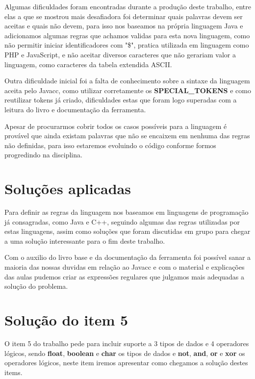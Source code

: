 \documentclass[
	article,			%
	11pt,				%
	oneside,			%
	a4paper,			%
	portuguese,			%
	brazil,				%
	sumario=tradicional
	]{abntex2}
\begin{document}
Algumas dificuldades foram encontradas durante a produção deste trabalho, entre elas a que se mostrou mais desafiadora foi determinar quais palavras devem ser aceitas e 
quais não devem, para isso nos baseamos na própria linguagem Java e adicionamos algumas regras que achamos validas para esta nova linguagem, como não permitir iniciar
identificadores com "\$", pratica utilizada em linguagem como PHP e JavaScript, e não aceitar diversos caracteres que não gerariam valor a linguagem, como caracteres da  tabela
extendida ASCII.

Outra dificuldade inicial foi a falta de conhecimento sobre a sintaxe da linguagem aceita pelo Javacc, como utilizar corretamente os \textbf{SPECIAL\_TOKENS} e como reutilizar tokens
já criado, dificuldades estas que foram logo superadas com a leitura do livro e documentação da ferramenta.

Apesar de procurarmos cobrir todos os casos possíveis para a linguagem é provável que ainda existam palavras que não se encaixem em nenhuma das regras não definidas,
para isso estaremos evoluindo o código conforme formos progredindo na disciplina.

\section{Soluções aplicadas}

Para definir as regras da linguagem nos baseamos em linguagens de programação já consagradas, como Java e C++, seguindo algumas das regras utilizadas por estas
linguagens, assim como soluções que foram discutidas em grupo para chegar a uma solução interessante para o fim deste trabalho.

Com o auxilio do livro base e da documentação da ferramenta foi possível  sanar a maioria das nossas duvidas em relação ao Javacc e com o material e explicações das aulas
pudemos criar as expressões regulares que julgamos mais adequadas a solução do problema.

\section{Solução do item 5}

O item 5 do trabalho pede para incluir suporte a 3 tipos de dados e 4 operadores lógicos, sendo \textbf{float}, \textbf{boolean} e \textbf{char} os tipos de dados 
e \textbf{not}, \textbf{and}, \textbf{or} e \textbf{xor} os operadores lógicos, neste item iremos apresentar como chegamos a solução destes items.
\end{document}
